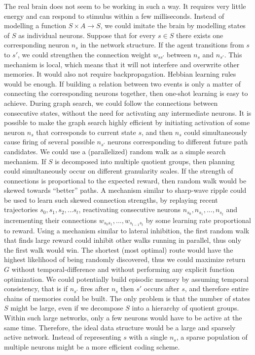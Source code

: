 \documentclass[12pt]{article}
\begin{document}
The real brain does not seem to be working in such a way. It requires very little energy and can respond to stimulus within a few milliseconds. Instead of modelling a function $S\times A \rightarrow S$, we could imitate the brain by modelling states of $S$ as individual neurons. Suppose that for every $s\in S$ there exists one corresponding neuron $n_s$ in the network structure. If the agent transitions from $s$ to $s'$, we could strengthen the connection weight $w_{ss'}$ between $n_s$ and $n_{s'}$. This mechanism is local, which means that it will not interfere and overwrite other memories. It would also not require backpropagation. Hebbian learning rules would be enough. If building a relation between two events is only a matter of connecting the corresponding neurons together, then one-shot learning is easy to achieve. During graph search, we could follow the connections between consecutive states, without the need for activating any intermediate neurons. It is possible to make the graph search highly efficient by initiating activation of some neuron $n_{s}$ that corresponds to current state $s$, and then $n_s$ could simultaneously cause firing of several possible $n_{s'}$ neurons corresponding to different future path candidates. We could use a (parallelized) random walk  as a simple search mechanism. If $S$ is decomposed into multiple quotient groups, then planning could simultaneously occur on different granularity scales. If the strength of connections is proportional to the expected reward, then random walk would be skewed towards ``better'' paths. A mechanism similar to sharp-wave ripple could be used to learn such skewed connection strengths, by replaying recent trajectories $s_0,s_1,s_2,...s_t$, reactivating consecutive neurons $n_{s_0},n_{s_1},...,n_{s_t}$ and incrementing their connections $w_{s_0s_1},...,w_{s_{t-1}s_t}$ by some learning rate proportional to reward. Using a mechanism similar to lateral inhibition, the first random walk that finds  large reward could inhibit other walks running in parallel, thus only the first walk would win. The shortest (most optimal) route would have the highest likelihood of being randomly discovered, thus we could maximize return $G$ without temporal-difference and without performing any explicit function optimization. We could potentially build episodic memory by assuming temporal consistency, that is if $n_{s'}$ fires after $n_{s}$ then $s'$ occurs after $s$, and therefore entire chains of memories could be built. The only problem is that the number of states $S$ might be large, even if we decompose $S$ into a hierarchy of quotient groups. Within such large networks, only a few neurons would have to be active at the same time. Therefore, the ideal data structure would be a large and sparsely active network.  Instead of representing $s$ with a single $n_{s}$, a sparse population of multiple neurons might be a more efficient coding scheme.
\end{document}
